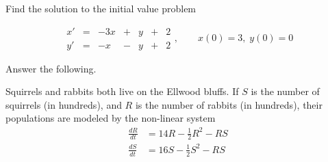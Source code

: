 \documentclass[addpoints,12pt]{exam}
\begin{document}
\newpage
\begin{questions}
 
 \question[10] Find the solution to the initial value problem
 
 $$\begin{array}{ccccccc}
  x' & = & -3x & + & y&+&2 \\
  y' & = & -x & - & y&+&2
 \end{array},\qquad x(0)=3,\;y(0)=0$$
 
 \newpage
 
  \question[18] Answer the following.
 
 \newpage
 
 \question[12] Squirrels and rabbits both live on the Ellwood bluffs. If $S$ is the number of squirrels (in hundreds), and $R$ is the number of rabbits (in hundreds), their populations are modeled by the non-linear system
 \begin{align*}
  \frac{dR}{dt}&=14R-\frac{1}{2}R^2-RS\\
  \frac{dS}{dt}&=16S-\frac{1}{2}S^2-RS
 \end{align*}
\end{questions}
\end{document}
